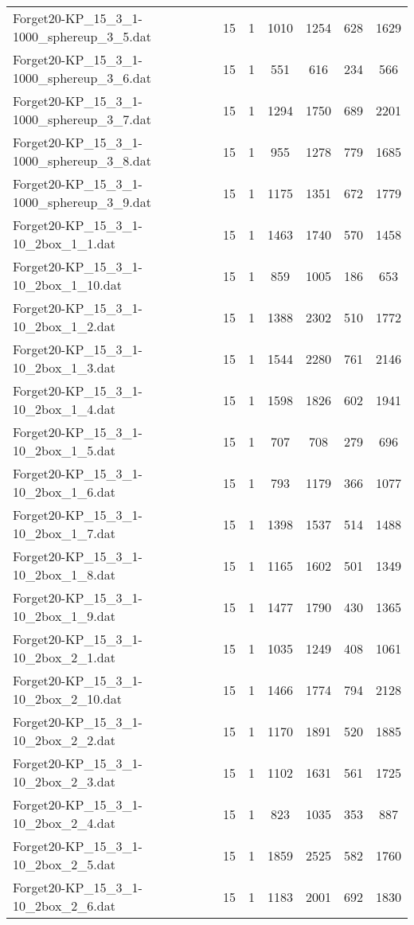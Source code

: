 \begin{table}[!ht]
\begin{tabular}{lcccccc}
Forget20-KP\_15\_3\_1-1000\_sphereup\_3\_5.dat & 15 & 1 & 1010 & 1254 & 628 & 1629 \\
Forget20-KP\_15\_3\_1-1000\_sphereup\_3\_6.dat & 15 & 1 & 551 & 616 & 234 & 566 \\
Forget20-KP\_15\_3\_1-1000\_sphereup\_3\_7.dat & 15 & 1 & 1294 & 1750 & 689 & 2201 \\
Forget20-KP\_15\_3\_1-1000\_sphereup\_3\_8.dat & 15 & 1 & 955 & 1278 & 779 & 1685 \\
Forget20-KP\_15\_3\_1-1000\_sphereup\_3\_9.dat & 15 & 1 & 1175 & 1351 & 672 & 1779 \\
Forget20-KP\_15\_3\_1-10\_2box\_1\_1.dat & 15 & 1 & 1463 & 1740 & 570 & 1458 \\
Forget20-KP\_15\_3\_1-10\_2box\_1\_10.dat & 15 & 1 & 859 & 1005 & 186 & 653 \\
Forget20-KP\_15\_3\_1-10\_2box\_1\_2.dat & 15 & 1 & 1388 & 2302 & 510 & 1772 \\
Forget20-KP\_15\_3\_1-10\_2box\_1\_3.dat & 15 & 1 & 1544 & 2280 & 761 & 2146 \\
Forget20-KP\_15\_3\_1-10\_2box\_1\_4.dat & 15 & 1 & 1598 & 1826 & 602 & 1941 \\
Forget20-KP\_15\_3\_1-10\_2box\_1\_5.dat & 15 & 1 & 707 & 708 & 279 & 696 \\
Forget20-KP\_15\_3\_1-10\_2box\_1\_6.dat & 15 & 1 & 793 & 1179 & 366 & 1077 \\
Forget20-KP\_15\_3\_1-10\_2box\_1\_7.dat & 15 & 1 & 1398 & 1537 & 514 & 1488 \\
Forget20-KP\_15\_3\_1-10\_2box\_1\_8.dat & 15 & 1 & 1165 & 1602 & 501 & 1349 \\
Forget20-KP\_15\_3\_1-10\_2box\_1\_9.dat & 15 & 1 & 1477 & 1790 & 430 & 1365 \\
Forget20-KP\_15\_3\_1-10\_2box\_2\_1.dat & 15 & 1 & 1035 & 1249 & 408 & 1061 \\
Forget20-KP\_15\_3\_1-10\_2box\_2\_10.dat & 15 & 1 & 1466 & 1774 & 794 & 2128 \\
Forget20-KP\_15\_3\_1-10\_2box\_2\_2.dat & 15 & 1 & 1170 & 1891 & 520 & 1885 \\
Forget20-KP\_15\_3\_1-10\_2box\_2\_3.dat & 15 & 1 & 1102 & 1631 & 561 & 1725 \\
Forget20-KP\_15\_3\_1-10\_2box\_2\_4.dat & 15 & 1 & 823 & 1035 & 353 & 887 \\
Forget20-KP\_15\_3\_1-10\_2box\_2\_5.dat & 15 & 1 & 1859 & 2525 & 582 & 1760 \\
Forget20-KP\_15\_3\_1-10\_2box\_2\_6.dat & 15 & 1 & 1183 & 2001 & 692 & 1830 \\

\end{tabular}
\end{table}
